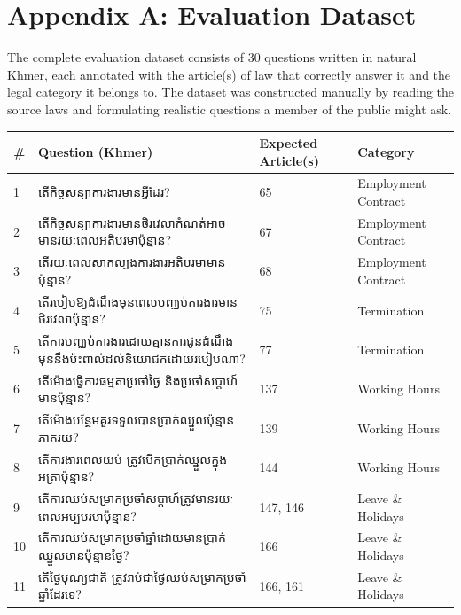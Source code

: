 \section*{Appendix A: Evaluation Dataset}

\hs The complete evaluation dataset consists of 30 questions written in natural Khmer,
each annotated with the article(s) of law that correctly answer it and the legal
category it belongs to. The dataset was constructed manually by reading the source laws
and formulating realistic questions a member of the public might ask.

\begin{longtable}{p{0.5cm} p{7.5cm} p{2.2cm} p{3cm}}
\toprule
\textbf{\#} & \textbf{Question (Khmer)} & \textbf{Expected Article(s)} & \textbf{Category} \\
\midrule
\endhead
1  & {\khmerfont តើកិច្ចសន្យាការងារមានអ្វីដែរ?} & 65 & Employment Contract \\ \midrule
2  & {\khmerfont តើកិច្ចសន្យាការងារមានថិរវេលាកំណត់អាចមានរយៈពេលអតិបរមាប៉ុន្មាន?} & 67 & Employment Contract \\ \midrule
3  & {\khmerfont តើរយៈពេលសាកល្បងការងារអតិបរមាមានប៉ុន្មាន?} & 68 & Employment Contract \\ \midrule
4  & {\khmerfont តើរបៀបឱ្យដំណឹងមុនពេលបញ្ឈប់ការងារមានថិរវេលាប៉ុន្មាន?} & 75 & Termination \\ \midrule
5  & {\khmerfont តើការបញ្ឈប់ការងារដោយគ្មានការជូនដំណឹងមុននឹងប៉ះពាល់ដល់និយោជកដោយរបៀបណា?} & 77 & Termination \\ \midrule
6  & {\khmerfont តើម៉ោងធ្វើការធម្មតាប្រចាំថ្ងៃ និងប្រចាំសប្តាហ៍មានប៉ុន្មាន?} & 137 & Working Hours \\ \midrule
7  & {\khmerfont តើម៉ោងបន្ថែមគួរទទួលបានប្រាក់ឈ្នួលប៉ុន្មានភាគរយ?} & 139 & Working Hours \\ \midrule
8  & {\khmerfont តើការងារពេលយប់ ត្រូវបើកប្រាក់ឈ្នួលក្នុងអត្រាប៉ុន្មាន?} & 144 & Working Hours \\ \midrule
9  & {\khmerfont តើការឈប់សម្រាកប្រចាំសប្តាហ៍ត្រូវមានរយៈពេលអប្បបរមាប៉ុន្មាន?} & 147, 146 & Leave \& Holidays \\ \midrule
10 & {\khmerfont តើការឈប់សម្រាកប្រចាំឆ្នាំដោយមានប្រាក់ឈ្នួលមានប៉ុន្មានថ្ងៃ?} & 166 & Leave \& Holidays \\ \midrule
11 & {\khmerfont តើថ្ងៃបុណ្យជាតិ ត្រូវរាប់ជាថ្ងៃឈប់សម្រាកប្រចាំឆ្នាំដែរទេ?} & 166, 161 & Leave \& Holidays \\ \midrule

\end{longtable}
